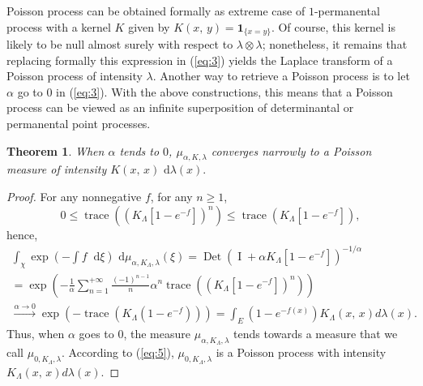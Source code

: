 \documentclass[11pt,a4paper]{amsart}
\newtheorem{Theorem}{Theorem}
\begin{document}
Poisson process can be obtained formally as extreme case of
$1$-permanental process with a kernel $K$ given by $K(x,\,
y)={{\mathbf 1}}_{\{x=y\}}$. Of course, this kernel is likely to be null almost
surely with respect to $\lambda\otimes \lambda$; nonetheless, it
remains that replacing formally this expression in (\ref{eq:3}) yields
the Laplace transform of a Poisson process of intensity
$\lambda$. Another way to retrieve a Poisson process is to let
$\alpha$ go to $0$ in (\ref{eq:3}). With the above constructions, this
means that a Poisson process can be viewed as an infinite
superposition of determinantal or permanental point processes.
\begin{Theorem}
  When $\alpha$ tends to $0$, $\mu_{\alpha,K,\lambda}$ converges
  narrowly to a Poisson measure of intensity $K(x,\, x){\text{ d}}\lambda(x).$
\end{Theorem}
\begin{proof}
  For any nonnegative $f$, for any $n\ge 1$,
  \begin{equation*}
    0\le
    {\operatorname{trace}}\left((K_{\Lambda}[1-e^{-f}])^n\right)\le
    {\operatorname{trace}}\left(K_{\Lambda}[1-e^{-f}]\right),
  \end{equation*}
  hence,
  \begin{multline}\label{eq:5}
    \int_{\chi}\exp\left(-\int f \ {\text{ d}}\xi
    \right){\text{ d}}\mu_{\alpha,K_{\Lambda},\lambda}(\xi)
    {={\operatorname{Det}}\left({\operatorname{I}}+\alpha K_{\Lambda}[1-e^{-f}]\right)^{-1/{\alpha}}}\\
    {=\exp\left(-\frac{1}{\alpha}\sum_{n=1}^{+\infty}\frac{(-1)^{n-1}}{n}\alpha^n {\operatorname{trace}}((K_{\Lambda}[1-e^{-f}])^n)\right)}\\
    {\xrightarrow{\alpha\rightarrow
        0}\exp\left(-{\operatorname{trace}}(K_{\Lambda}(1-e^{-f}))\right)}=\int_E(1-e^{-f(x)})K_{\Lambda}(x,\,
    x)d\lambda(x).
  \end{multline}
  Thus, when $\alpha$ goes to $0$, the measure
  $\mu_{\alpha,K_{\Lambda},\lambda}$ tends towards a measure that we
  call $\mu_{0,K_{\Lambda},\lambda}$. According to (\ref{eq:5}),
  $\mu_{0,K_{\Lambda},\lambda}$ is a Poisson process with intensity
  $K_{\Lambda}(x,\, x)d\lambda(x)$.
\end{proof}
\end{document}
